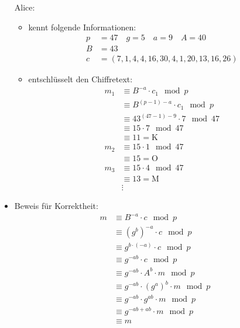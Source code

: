 \documentclass[
  a4paper,
  11pt,
]{article}
\begin{document}
\begin{itemize}
    Alice:
    \begin{itemize}
      \item kennt folgende Informationen:
        \begin{align*}
          p & = 47 \quad g = 5 \quad a = 9 \quad A = 40\\
          B & = 43\\
          c & = (7, 1, 4, 4, 16, 30, 4, 1, 20, 13, 16, 26)
        \end{align*}
      \item entschlüsselt den Chiffretext:
        \begin{align*}
          m_1 & \equiv B^{-a} \cdot c_1 \mod p\\
              & \equiv B^{(p-1)-a} \cdot c_1 \mod p\\
              & \equiv 43^{(47-1)-9} \cdot 7 \mod 47\\
              & \equiv 15 \cdot 7 \mod 47\\
              & \equiv 11 = \text{K}\\
          m_2 & \equiv 15 \cdot 1 \mod 47\\
              & \equiv 15 = \text{O}\\
          m_3 & \equiv 15 \cdot 4 \mod 47\\
              & \equiv 13 = \text{M}\\
              & \vdots
        \end{align*}
    \end{itemize}

  \item Beweis für Korrektheit:
    \begin{align*}
      m  & \equiv B^{-a} \cdot c \mod p\\
      & \equiv (g^b)^{-a} \cdot c \mod p\\
      & \equiv g^{b \cdot (-a)} \cdot c \mod p\\
      & \equiv g^{-ab} \cdot c \mod p\\
      & \equiv g^{-ab} \cdot A^b \cdot m \mod p\\
      & \equiv g^{-ab} \cdot (g^a)^b \cdot m \mod p\\
      & \equiv g^{-ab} \cdot g^{ab} \cdot m \mod p\\
      & \equiv g^{-ab+ab} \cdot m \mod p\\
      & \equiv m
    \end{align*}

\end{itemize}
\end{document}
